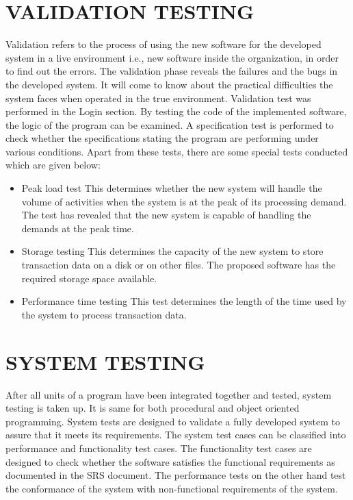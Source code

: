 \documentclass[12pt,a4paper,oneside]{report}
\begin{document}
{\section{VALIDATION TESTING}
\par Validation refers to the process of using the new software for the developed system in a live environment i.e., new software inside the organization, in order to find out the errors. The validation phase reveals the failures and the bugs in the developed system. It will come to know about the practical difficulties the system faces when operated in the true environment. Validation test was performed in the Login section. By testing the code of the implemented software, the logic of the program can be examined. A specification test is performed to check whether the specifications stating the program are performing under various conditions. Apart from these tests, there are some special tests conducted which are given below:
\begin{itemize}
\item Peak load test This determines whether the new system will handle the volume of activities when the system is at the peak of its processing demand. The test has revealed that the new system is capable of handling the demands at the peak time.
\item Storage testing This determines the capacity of the new system to store transaction data on a disk or on other files. The proposed software has the required storage space
available.
\item Performance time testing This test determines the length of the time used by the system to process transaction data.
\end{itemize}
\section{SYSTEM TESTING}
\par After all units of a program have been integrated together and tested, system testing is taken up. It is same for both procedural and object oriented programming. System tests are designed to validate a fully developed system to assure that it meets its requirements. The system test cases can be classified into performance and functionality test cases. The functionality test cases are designed to check whether the software satisfies the functional requirements as documented in the SRS document. The performance tests on the other hand test the conformance of the system with non-functional requirements of the system.\\
}
\end{document}
